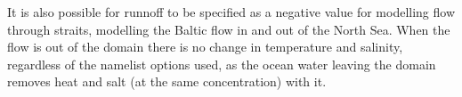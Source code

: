 \documentclass[../main/NEMO_manual]{subfiles}
\begin{document}
It is also possible for runnoff to be specified as a negative value for modelling flow through straits,
\ie modelling the Baltic flow in and out of the North Sea.
When the flow is out of the domain there is no change in temperature and salinity,
regardless of the namelist options used,
as the ocean water leaving the domain removes heat and salt (at the same concentration) with it. 






%


\end{document}

